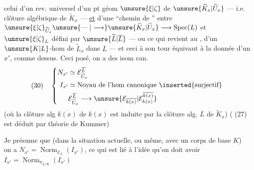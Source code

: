 celui d'un rev. universel   d'un pt géom $\unsure{\xi|\zeta}$ de $\unsure{\widetilde K_x|\widetilde U_x}$ --- i.e.  clôture algébrique de $\widetilde K_x$ --- \uline{et} d'une  ``chemin de '' entre $\unsure{\xi|\zeta}_{\widetilde U_x}\unsure{\mathrel{\text{---}}|\longrightarrow}\unsure{\widetilde K_x|\widetilde U_x}\longrightarrow\operatorname{Spec}(L)$ et $\unsure{\xi|\zeta}_L$ défini par $\unsure{\widetilde L|\overline L}$ --- ou ce qui revient au ,  d'un $\unsure{K|L}$-hom de  $\widetilde L_x$ dans $\overline L$ --- et ceci à son tour équivaut à la donnée d'un $x'$,  comme dessus. Ceci posé, on a des isom can.
\[
(30)\quad\left\{\begin{aligned}
N_{x'}&\simeq\mathcal E_{\widetilde U_x}^{\overline L}\\
I_{x'}&\simeq\text{Noyau de l'hom canonique }\inserted{\text{surjectif}}\\
&\mathcal E_{\widetilde U_x}^{\overline L}\longrightarrow\unsure{\mathcal E_{\overline{k(x)}}|\mathcal E_{k(x)}^{\overline{k(x)}}}
\end{aligned}\right.
\]
(où la clôture alg $\overline{k(x)}$ de $k(x)$ est induite par la clôture alg. $\overline L$ de $\widetilde K_x$)
( (27) est déduit par théorie de Kummer)

Je présume que (dans la situation actuelle, ou même, avec un corps de base $K$) on a $N_{x'}=\operatorname{Norm}_{\mathcal E_L}(I_{x'})$,  ce qui est lié à l'idée qu'on doit avoir $I_{x'}=\operatorname{Norm}_{\pi_{L/K}}(I_{x'})$
